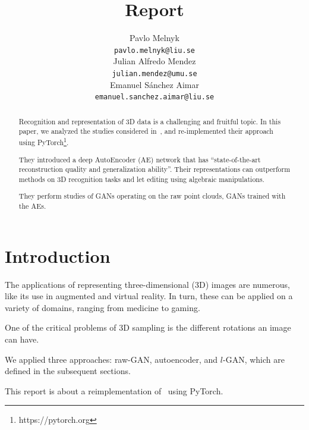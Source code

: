 \documentclass[12pt]{article}
\title{Report}
\author{
    Pavlo Melnyk \\
    \texttt{pavlo.melnyk@liu.se} \\
    \And
    Julian Alfredo Mendez \\
    \texttt{julian.mendez@umu.se} \\
    \And
    Emanuel S\'{a}nchez Aimar \\
    \texttt{emanuel.sanchez.aimar@liu.se} \\
}
\newcommand{\contentdescription}[1]{}
\begin{document}
    \maketitle

    \begin{abstract}
        \contentdescription{
            Abstract (5-10\%):
            Give an overview of what you have done in the project with the key results and findings of your work.
            Should be no more than 300 words.
        }

        Recognition and representation of 3D data is a challenging and fruitful topic.
        In this paper, we analyzed the studies considered in~\cite{pmlr-v80-achlioptas18a}, and re-implemented their approach using PyTorch\footnote{https://pytorch.org}.

        They introduced a deep AutoEncoder (AE) network that has ``state-of-the-art reconstruction quality and generalization ability''.
        Their representations can outperform methods on 3D recognition tasks and let editing using algebraic manipulations.

        They perform studies of GANs operating on the raw point clouds, GANs trained with the AEs.
    \end{abstract}


    \section{Introduction}

    \contentdescription{
        Introduction (5-15\%):
        Describe the problem, the approach of the paper, the experiments, and the results.
        At the high-level talk about what you worked on in your project and why it is important.
        Then give an overview of your results.
    }

    The applications of representing three-dimensional (3D) images are numerous, like its use in augmented and virtual reality.
    In turn, these can be applied on a variety of domains, ranging from medicine to gaming.

    One of the critical problems of 3D sampling is the different rotations an image can have.

    We applied three approaches: raw-GAN, autoencoder, and $l$-GAN, which are defined in the subsequent sections.

    This report is about a reimplementation of~\cite{pmlr-v80-achlioptas18a} using PyTorch.
\end{document}
